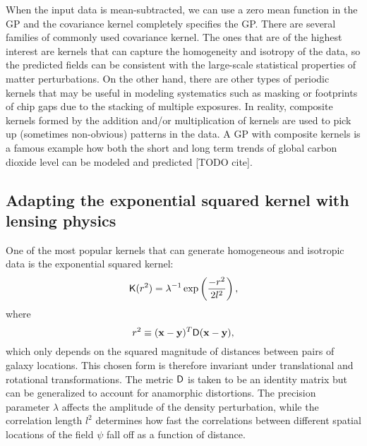 When the input data is mean-subtracted, we can use a zero mean function in the
GP and the covariance kernel completely specifies the GP. 
There are several families of commonly used covariance kernel.
The ones that are of the highest interest are kernels that can capture 
the homogeneity and isotropy of the data, so the predicted fields can   
be consistent with the large-scale statistical properties of 
matter perturbations.
On the other hand, there are other types of periodic kernels that may be useful
in modeling systematics such as masking or footprints of chip gaps due to the
stacking of multiple exposures.
In reality, composite kernels formed by the addition and/or multiplication of
kernels are used to pick up (sometimes non-obvious) patterns in the data. 
A GP with composite kernels is a
famous example how both the short and long term trends of global carbon
dioxide level can be modeled and predicted [TODO cite].

\subsection{Adapting the exponential squared kernel with lensing physics}
One of the most popular kernels that can generate homogeneous and
isotropic data is the exponential squared kernel: 
\begin{equation}
	\mathsf{K}(r^2) = \lambda^{-1} \exp\left(\frac{-r^2}{2 l^2}\right),
	\label{eq:exp_sq_kernel}
\end{equation}
where 
\begin{equation}
	r^2 \equiv (\mathbf{x} - \mathbf{y})^T \mathsf{D} (\mathbf{x} - \mathbf{y}), 
\end{equation}
which only depends on the
squared magnitude of distances between pairs of galaxy locations. 
This chosen form is therefore invariant
under translational and rotational transformations.
The metric $\mathsf{D}$ is taken to be an identity matrix but  
can be generalized to account for anamorphic distortions. 
The precision parameter $\lambda$ affects the 
amplitude of the density perturbation, while the correlation length $l^2$ 
determines how fast the correlations between different spatial locations of the
field $\psi$ fall off as a function of distance.

